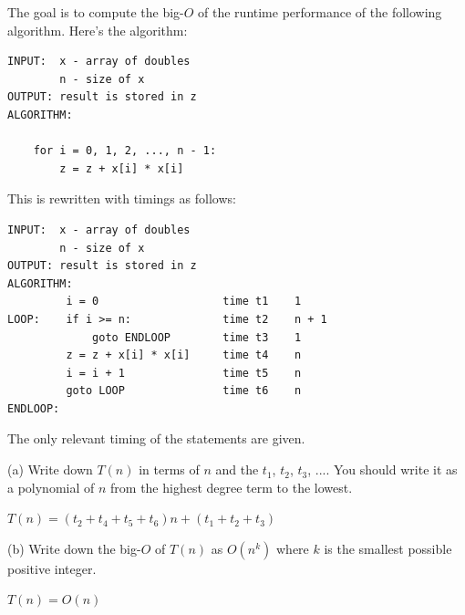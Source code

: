 The goal is to compute the big-$O$ of the runtime performance
of the following algorithm. 
Here's the algorithm:
\begin{Verbatim}[frame=single]
INPUT:  x - array of doubles
        n - size of x        
OUTPUT: result is stored in z
ALGORITHM:

    for i = 0, 1, 2, ..., n - 1:
        z = z + x[i] * x[i]
\end{Verbatim}
This is rewritten with timings as follows:
\begin{Verbatim}[frame=single]
INPUT:  x - array of doubles
        n - size of x
OUTPUT: result is stored in z
ALGORITHM:                      
         i = 0                   time t1    1    
LOOP:    if i >= n:              time t2    n + 1  
             goto ENDLOOP        time t3    1  
         z = z + x[i] * x[i]     time t4    n  
         i = i + 1               time t5    n
         goto LOOP               time t6    n
ENDLOOP:
\end{Verbatim}
The only relevant timing of the statements are given.


(a) Write down $T(n)$ in terms of $n$ and the 
$t_1$, $t_2$, $t_3$, ....
You should write it as a polynomial of $n$ from the highest
degree term to the lowest.

$T(n) = (t_{2} + t_{4} + t_{5} + t_{6})n + (t_{1} + t_{2} + t_{3})$

(b) Write down the big-$O$ of $T(n)$ as $O(n^k)$
where $k$ is the smallest possible  positive integer.

$T(n) = O(n)$
